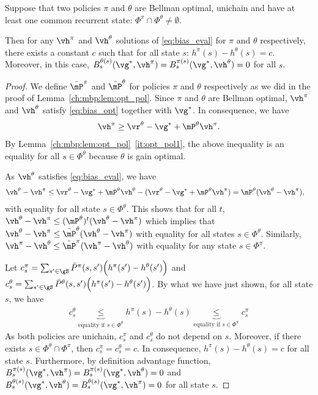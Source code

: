 \begin{lem}
    \label{ch:mbp:lem:equi_bias}
    Suppose that two policies $\pi$ and $\theta$ are Bellman optimal, unichain and have at least one common recurrent state: $\Phi^\pi\cap\Phi^\theta\neq\emptyset$.
    
    Then for any $\vh^\pi$ and $\vh^\theta$ solutions of \eqref{eq:bias_eval} for $\pi$ and $\theta$ respectively, there exists a constant $c$ such that for all state $s$: $h^\pi(s) -h^\theta(s) =c$. Moreover, in this case, ${B_s^{\theta(s)}(\vg^*, \vh^\pi)=B_s^{\pi(s)}(\vg^*, \vh^\theta)=0}$ for all $s$.
\end{lem}
\begin{proof}
    We define $\bar{\mP}^\pi$ and $\bar{\mP}^\theta$ for policies $\pi$ and $\theta$ respectively as we did in the proof of Lemma~\ref{ch:mbp:lem:opt_pol}.
    Since $\pi$ and $\theta$ are Bellman optimal, $\vh^\pi$ and $\vh^\theta$ satisfy \eqref{eq:bias_opt} together with $\vg^*$.
    In consequence, we have
    \begin{align*}
        \vh^\pi \ge \vr^\theta -\vg^* +\mP^\theta\vh^\pi.
    \end{align*}
    By Lemma~\ref{ch:mbp:lem:opt_pol}~\ref{it:opt_pol1}, the above inequality is an equality for all $s\in\Phi^\theta$ because $\theta$ is gain optimal.

    As $\vh^\theta$ satisfies \eqref{eq:bias_eval}, we have
    \begin{align*}
        \vh^\theta -\vh^\pi &\le \vr^\theta -\vg^* +\mP^\theta\vh^\theta -(\vr^\theta -\vg^* +\mP^\theta\vh^\pi) = \mP^\theta(\vh^\theta -\vh^\pi),
    \end{align*}
    with equality for all state $s\in\Phi^\theta$. This shows that for all $t$, $\vh^\theta -\vh^\pi\le (\mP^\theta)^t(\vh^\theta -\vh^\pi)$ which implies that $\vh^\theta -\vh^\pi\le \bar{\mP}^\theta(\vh^\theta -\vh^\pi)$ with equality for all states $s\in\Phi^\theta$. Similarly, $\vh^\pi -\vh^\theta \le \bar{\mP}^\pi(\vh^\pi -\vh^\theta)$ with equality for any state $s\in\Phi^\pi$.

    Let $c^\pi_s=\sum_{s'\in\gS}\bar{P}^\pi(s,s')\Big(h^\pi(s')-h^\theta(s')\Big)$ and $c^\theta_s=\sum_{s'\in\gS}\bar{P}^\theta(s,s')\Big(h^\pi(s')-h^\theta(s')\Big)$. By what we have just shown, for all state $s$, we have
    \begin{align*}
        c^\theta_s \underbrace{\le}_{\text{equality if $s\in\Phi^\theta$}} h^\pi(s)-h^\theta(s) \underbrace{\le}_{\text{equality if $s\in\Phi^\pi$}} c^\pi_s
    \end{align*}
    As both policies are unichain, $c^\pi_s$ and $c^\theta_s$ do not depend on $s$.
    Moreover, if there exists $s\in\Phi^\theta\cap\Phi^\pi$, then $c^\pi_s=c^\theta_s = c$. In consequence,  $h^\pi(s)-h^\theta(s)=c$ for all state $s$. 
    Furthermore, by definition advantage function, $B_s^{\pi(s)}(\vg^*, \vh^\pi)=B_s^{\pi(s)}(\vg^*, \vh^\theta)=0$ and $B_s^{\theta(s)}(\vg^*, \vh^\theta)=B_s^{\theta(s)}(\vg^*, \vh^\pi)=0$ for all state $s$.
\end{proof}

